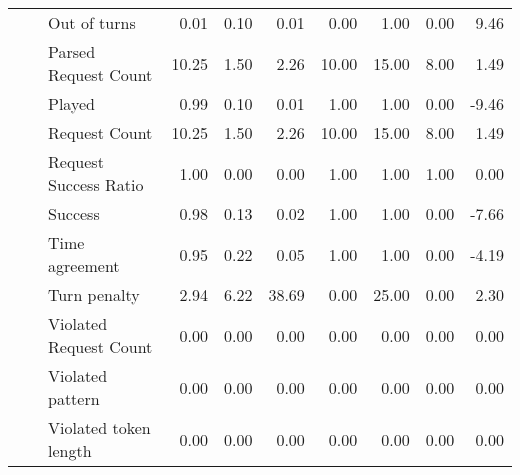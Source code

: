 \begin{tabular}{lllrrrrrrr}
 &  & Out of turns & 0.01 & 0.10 & 0.01 & 0.00 & 1.00 & 0.00 & 9.46 \\
 &  & Parsed Request Count & 10.25 & 1.50 & 2.26 & 10.00 & 15.00 & 8.00 & 1.49 \\
 &  & Played & 0.99 & 0.10 & 0.01 & 1.00 & 1.00 & 0.00 & -9.46 \\
 &  & Request Count & 10.25 & 1.50 & 2.26 & 10.00 & 15.00 & 8.00 & 1.49 \\
 &  & Request Success Ratio & 1.00 & 0.00 & 0.00 & 1.00 & 1.00 & 1.00 & 0.00 \\
 &  & Success & 0.98 & 0.13 & 0.02 & 1.00 & 1.00 & 0.00 & -7.66 \\
 &  & Time agreement & 0.95 & 0.22 & 0.05 & 1.00 & 1.00 & 0.00 & -4.19 \\
 &  & Turn penalty & 2.94 & 6.22 & 38.69 & 0.00 & 25.00 & 0.00 & 2.30 \\
 &  & Violated Request Count & 0.00 & 0.00 & 0.00 & 0.00 & 0.00 & 0.00 & 0.00 \\
 &  & Violated pattern & 0.00 & 0.00 & 0.00 & 0.00 & 0.00 & 0.00 & 0.00 \\
 &  & Violated token length & 0.00 & 0.00 & 0.00 & 0.00 & 0.00 & 0.00 & 0.00 \\
\cline{1-10} \cline{2-10}
\bottomrule
\end{tabular}
